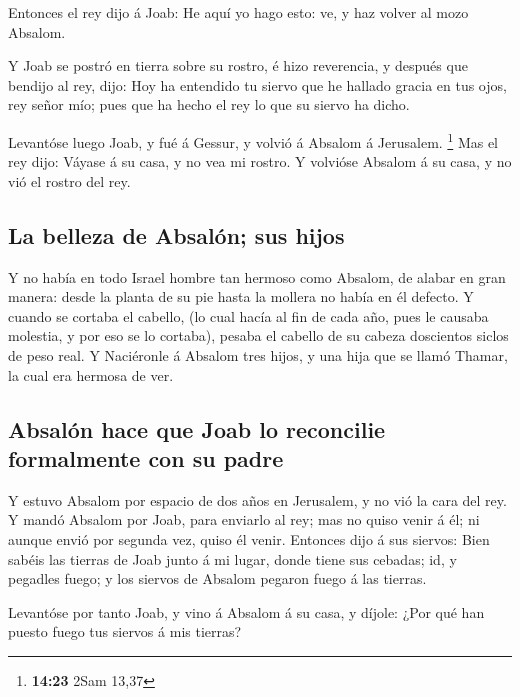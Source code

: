 Entonces el rey dijo á Joab: He aquí yo hago esto: ve, y
haz volver al mozo Absalom.

 Y Joab se postró en tierra sobre su rostro, é hizo
reverencia, y después que bendijo al rey, dijo: Hoy ha entendido tu
siervo que he hallado gracia en tus ojos, rey señor mío; pues que ha
hecho el rey lo que su siervo ha dicho.

 Levantóse luego Joab, y fué á Gessur, y volvió á Absalom
á Jerusalem. \footnote{\textbf{14:23} 2Sam 13,37}  Mas el
rey dijo: Váyase á su casa, y no vea mi rostro. Y volvióse Absalom á su
casa, y no vió el rostro del rey.

\hypertarget{la-belleza-de-absaluxf3n-sus-hijos}{%
\subsection{La belleza de Absalón; sus
hijos}\label{la-belleza-de-absaluxf3n-sus-hijos}}

 Y no había en todo Israel hombre tan hermoso como
Absalom, de alabar en gran manera: desde la planta de su pie hasta la
mollera no había en él defecto.  Y cuando se cortaba el
cabello, (lo cual hacía al fin de cada año, pues le causaba molestia, y
por eso se lo cortaba), pesaba el cabello de su cabeza doscientos siclos
de peso real.  Y Naciéronle á Absalom tres hijos, y una
hija que se llamó Thamar, la cual era hermosa de ver.

\hypertarget{absaluxf3n-hace-que-joab-lo-reconcilie-formalmente-con-su-padre}{%
\subsection{Absalón hace que Joab lo reconcilie formalmente con su
padre}\label{absaluxf3n-hace-que-joab-lo-reconcilie-formalmente-con-su-padre}}

 Y estuvo Absalom por espacio de dos años en Jerusalem, y
no vió la cara del rey.  Y mandó Absalom por Joab, para
enviarlo al rey; mas no quiso venir á él; ni aunque envió por segunda
vez, quiso él venir.  Entonces dijo á sus siervos: Bien
sabéis las tierras de Joab junto á mi lugar, donde tiene sus cebadas;
id, y pegadles fuego; y los siervos de Absalom pegaron fuego á las
tierras.

 Levantóse por tanto Joab, y vino á Absalom á su casa, y
díjole: ¿Por qué han puesto fuego tus siervos á mis tierras?

